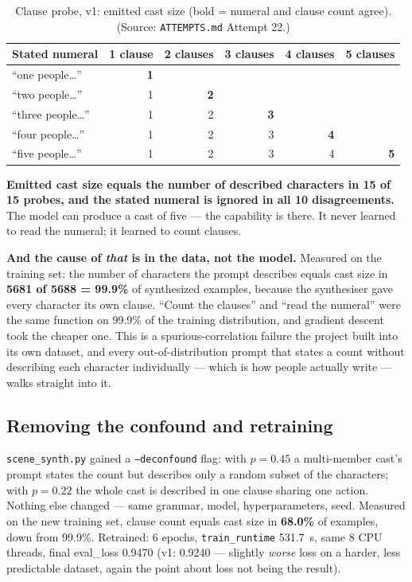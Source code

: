 \documentclass[11pt]{article}
\begin{document}
\begin{table}[h]
\centering
\caption{Clause probe, v1: emitted cast size (bold = numeral and clause
count agree). (Source: \texttt{ATTEMPTS.md} Attempt 22.)}
\label{tab:clauseprobe1}
\begin{tabular}{@{}lrrrrr@{}}
\toprule
Stated numeral & 1 clause & 2 clauses & 3 clauses & 4 clauses & 5 clauses \\
\midrule
``one people\ldots'' & \textbf{1} & & & & \\
``two people\ldots'' & 1 & \textbf{2} & & & \\
``three people\ldots'' & 1 & 2 & \textbf{3} & & \\
``four people\ldots'' & 1 & 2 & 3 & \textbf{4} & \\
``five people\ldots'' & 1 & 2 & 3 & 4 & \textbf{5} \\
\bottomrule
\end{tabular}
\end{table}

\textbf{Emitted cast size equals the number of described characters in
15 of 15 probes, and the stated numeral is ignored in all 10
disagreements.} The model can produce a cast of five --- the capability
is there. It never learned to read the numeral; it learned to count
clauses.

\textbf{And the cause of \emph{that} is in the data, not the model.}
Measured on the training set: the number of characters the prompt
describes equals cast size in \textbf{5681 of 5688 = 99.9\%} of
synthesized examples, because the synthesiser gave every character its
own clause. ``Count the clauses'' and ``read the numeral'' were the same
function on 99.9\% of the training distribution, and gradient descent
took the cheaper one. This is a spurious-correlation failure the project
built into its own dataset, and every out-of-distribution prompt that
states a count without describing each character individually --- which
is how people actually write --- walks straight into it.

\subsection{Removing the confound and retraining}
\label{sec:deconfound}

\texttt{scene\_synth.py} gained a \texttt{--deconfound} flag: with $p=0.45$
a multi-member cast's prompt states the count but describes only a random
subset of the characters; with $p=0.22$ the whole cast is described in
one clause sharing one action. Nothing else changed --- same grammar,
model, hyperparameters, seed. Measured on the new training set, clause
count equals cast size in \textbf{68.0\%} of examples, down from 99.9\%.
Retrained: 6 epochs, \texttt{train\_runtime} 531.7~s, same 8 CPU threads,
final eval\_loss 0.9470 (v1: 0.9240 --- slightly \emph{worse} loss on a
harder, less predictable dataset, again the point about loss not being
the result).
\end{document}
